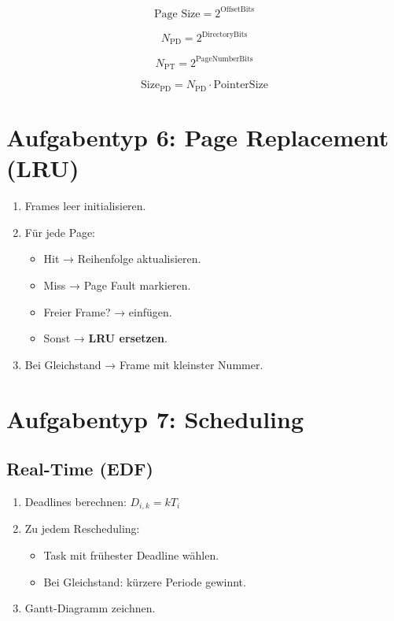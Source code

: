 \documentclass[a4paper,11pt]{article}
\begin{document}
\begin{tcolorbox}[colback=bsybg,colframe=bsygreen,title=\textbf{Wichtigste Formeln}]

\[
\text{Page Size} = 2^{\text{OffsetBits}}
\]

\[
N_{\text{PD}} = 2^{\text{DirectoryBits}}
\]

\[
N_{\text{PT}} = 2^{\text{PageNumberBits}}
\]

\[
\text{Size}_{\text{PD}} = N_{\text{PD}} \cdot \text{PointerSize}
\]

\end{tcolorbox}

\section{Aufgabentyp 6: Page Replacement (LRU)}

\begin{tcolorbox}[colback=bsybg,colframe=bsyred,title=\textbf{LRU – idiotensicheres Rezept}]
\begin{enumerate}
\item Frames leer initialisieren.
\item Für jede Page:
\begin{itemize}
\item Hit → Reihenfolge aktualisieren.
\item Miss → Page Fault markieren.
\item Freier Frame? → einfügen.
\item Sonst → \textbf{LRU ersetzen}.
\end{itemize}
\item Bei Gleichstand → Frame mit kleinster Nummer.
\end{enumerate}
\end{tcolorbox}

\section{Aufgabentyp 7: Scheduling}

\subsection*{Real-Time (EDF)}

\begin{tcolorbox}[colback=bsybg,colframe=bsyblue,title=\textbf{EDF Rezept}]
\begin{enumerate}
\item Deadlines berechnen: \(D_{i,k} = kT_i\)
\item Zu jedem Rescheduling:
\begin{itemize}
\item Task mit frühester Deadline wählen.
\item Bei Gleichstand: kürzere Periode gewinnt.
\end{itemize}
\item Gantt-Diagramm zeichnen.
\end{enumerate}
\end{tcolorbox}
\end{document}
